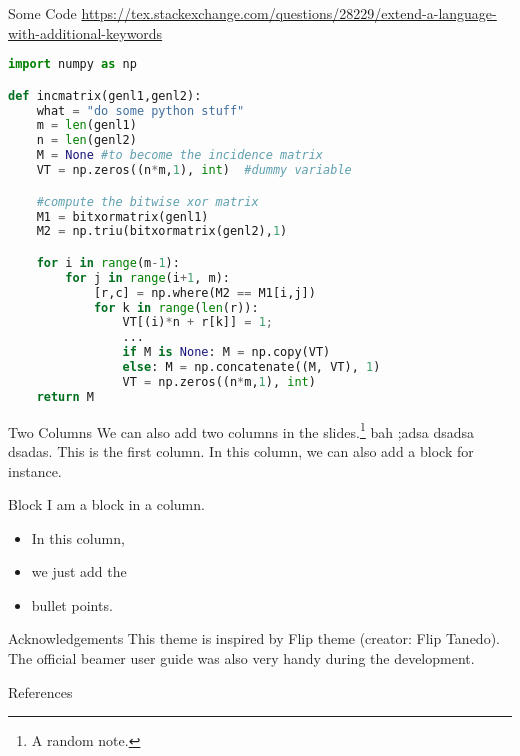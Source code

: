 \documentclass{\FormatDir corpborepresMulti}
\begin{document}
\begin{frame}{Some Code}  %
	\url{https://tex.stackexchange.com/questions/28229/extend-a-language-with-additional-keywords}
\begin{lstlisting}[language=Python]
import numpy as np

def incmatrix(genl1,genl2):
	what = "do some python stuff"
    m = len(genl1)
    n = len(genl2)
    M = None #to become the incidence matrix
    VT = np.zeros((n*m,1), int)  #dummy variable

    #compute the bitwise xor matrix
    M1 = bitxormatrix(genl1)
    M2 = np.triu(bitxormatrix(genl2),1)

    for i in range(m-1):
        for j in range(i+1, m):
            [r,c] = np.where(M2 == M1[i,j])
            for k in range(len(r)):
                VT[(i)*n + r[k]] = 1;
    			...
                if M is None: M = np.copy(VT)
                else: M = np.concatenate((M, VT), 1)
                VT = np.zeros((n*m,1), int)
    return M
\end{lstlisting}
\end{frame}

	\begin{frame}{Two Columns}
		We can also add two columns in the slides.\footnote[frame]{A random note.} bah ;adsa dsadsa dsadas.
		\begColFF
				This is the first column. In this column, we can also add a block for instance.
				\vspace{1em}
				\begin{block}{Block}
					I am a block in a column.
				\end{block}
			\nextCol
				\begin{itemize}
					\item In this column,
					\item we just add the
					\item bullet points.
				\end{itemize}
			\endCol
	\end{frame}

	\begin{frame}{Acknowledgements}
		This theme is inspired by Flip theme (creator: Flip Tanedo). The official beamer user guide was also very handy during the development.
	\end{frame}

	\begin{frame}[allowframebreaks]{References}
%		
%		
	\end{frame}
\end{document}
